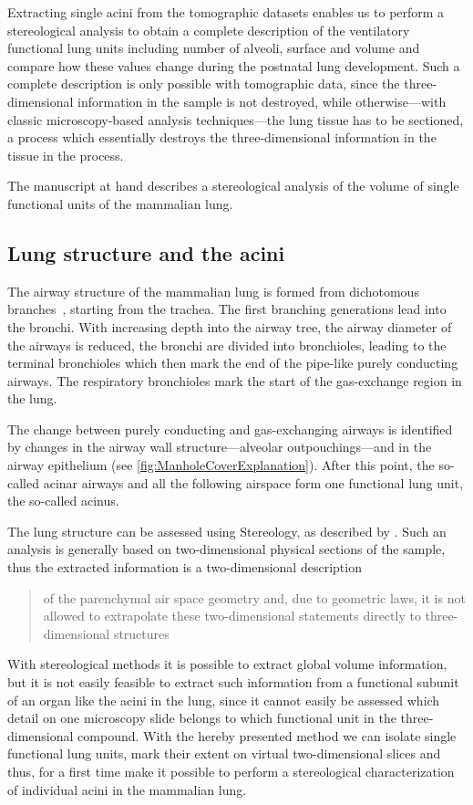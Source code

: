 \documentclass[paper=a4,abstract=true,english,DIV=calc]{scrartcl}
\begin{document}
Extracting single acini from the tomographic datasets enables us to perform a stereological analysis to obtain a complete description of the ventilatory functional lung units including number of alveoli, surface and volume and compare how these values change during the postnatal lung development.
Such a complete description is only possible with tomographic data, since the three-dimensional information in the sample is not destroyed, while otherwise---with classic microscopy-based analysis techniques---the lung tissue has to be sectioned, a process which essentially destroys the three-dimensional information in the tissue in the process.

The manuscript at hand describes a stereological analysis of the volume of single functional units of the mammalian lung.

\subsection{Lung structure and the acini}
The airway structure of the mammalian lung is formed from dichotomous branches~\cite{Weibel1991}, starting from the trachea.
The first branching generations lead into the bronchi.
With increasing depth into the airway tree, the airway diameter of the airways is reduced, the bronchi are divided into bronchioles, leading to the terminal bronchioles which then mark the end of the pipe-like purely conducting airways.
The respiratory bronchioles mark the start of the gas-exchange region in the lung.

The change between purely conducting and gas-exchanging airways is identified by changes in the airway wall structure---alveolar outpouchings---and in the airway epithelium (see \autoref{fig:ManholeCoverExplanation}).
After this point, the so-called acinar airways and all the following airspace form one functional lung unit, the so-called acinus.

The lung structure can be assessed using Stereology, as described by \citet{Hsia2010}.
Such an analysis is generally based on two-dimensional physical sections of the sample, thus the extracted information is a two-dimensional description \blockquote[\citet{Tschanz2002}]{of the parenchymal air space geometry and, due to geometric laws, it is not allowed to extrapolate these two-dimensional statements directly to three-dimensional structures}.
With stereological methods it is possible to extract global volume information, but it is not easily feasible to extract such information from a functional subunit of an organ like the acini in the lung, since it cannot easily be assessed which detail on one microscopy slide belongs to which functional unit in the three-dimensional compound.
With the hereby presented method we can isolate single functional lung units, mark their extent on virtual two-dimensional slices and thus, for a first time make it possible to perform a stereological characterization of individual acini in the mammalian lung.
\end{document}
